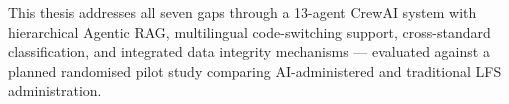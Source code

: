 \noindent This thesis addresses all seven gaps through a 13-agent CrewAI
system with hierarchical Agentic RAG, multilingual code-switching support,
cross-standard classification, and integrated data integrity mechanisms ---
evaluated against a planned randomised pilot study comparing AI-administered
and traditional LFS administration.
